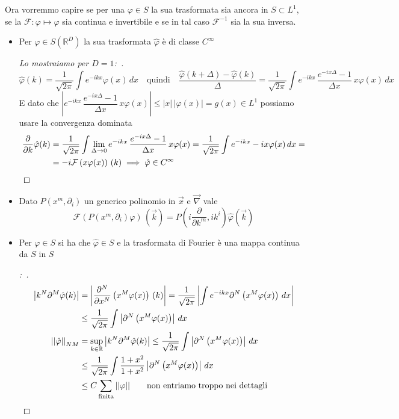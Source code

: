 \documentclass[11pt,a4paper,twoside]{book}
\newenvironment{dimo}[1][\proofname]{
	\begin{tcolorbox}[
	breakable, 
	enhanced, 
	interior hidden, 
	frame hidden, 
	borderline west = {1pt}{0pt}{gray}, 
	top=0pt, bottom=0pt, left=0pt]
\begin{proof}[#1:~]
}
{
\end{proof}
\end{tcolorbox}
}
\theoremstyle{esss}
\theoremstyle{dotless}
\numberwithin{equation}{section} %
\begin{document}
Ora vorremmo capire se per una $\varphi\in S$ la sua trasformata sia ancora in $S\subset L^1$, se la $\mathcal{F}:\varphi\mapsto\hat{\varphi}$ sia continua e invertibile e se in tal caso $\mathcal{F}^{-1}$ sia la sua inversa.


\begin{itemize}
\item Per $\varphi\in S(\mathbb{R}^D)$ la sua trasformata $\hat{\varphi}$ è di classe $C^\infty$
 \begin{dimo}[Lo mostraiamo  per $D=1$]
 \[
 \hat{\varphi}(k)=\dfrac{1}{\sqrt{2\pi}}\int e^{-ikx}\varphi(x)\,dx \quad \text{quindi}\quad
 \dfrac{ \hat{\varphi}(k+\Delta) -\hat{\varphi}(k)}{\Delta}=\dfrac{1}{\sqrt{2\pi}}\int e^{-ikx} \,  \dfrac{e^{-ix\Delta}-1}{\Delta x} \, x\varphi(x)\,dx
 \]
 E dato che $\left| e^{-ikx}\, \dfrac{e^{-ix\Delta}-1}{\Delta x} \, x\varphi(x)\right|\leq |x|\,|\varphi(x)|=g(x)\in L^1$ possiamo usare la convergenza dominata
 \begin{align*}
 \dfrac{\partial}{\partial k}\hat{\varphi}(k)&=\dfrac{1}{\sqrt{2\pi}}\int \lim_{\Delta\rightarrow0}  e^{-ikx}\, \dfrac{e^{-ix\Delta}-1}{\Delta x} \, x\varphi(x) = \dfrac{1}{\sqrt{2\pi}}\int e^{-ikx}-ix\varphi(x)\,dx=\\
 &=-i\mathcal{F}\left(x\varphi(x)\right)\,(k) \implies \hat{\varphi}\in C^\infty \qedhere
 \end{align*}
 \end{dimo}
\item Dato $P(x^m,\partial_i)$ un generico polinomio in $\vec{x}$ e $\vec{\nabla}$ vale
\begin{equation}
\mathcal{F}\left( P(x^m,\partial_i)\varphi \right) \, (\vec{k}) =
P\left(i\dfrac{\partial}{\partial k^m},ik^i\right)\hat{\varphi}(\vec{k})
\end{equation}
\item Per  $\varphi\in S$ si ha che $\hat{\varphi}\in S$ e la trasformata di Fourier è una mappa continua da $S$ in $S$
\begin{dimo}
\begin{align*}
\left| k^N\partial^M \hat{\varphi}(k) \right| &=\left| \dfrac{\partial^N}{\partial x^N} \left( x^M \varphi(x)\right) \, (k)\right| = \dfrac{1}{\sqrt{2\pi}}\left| \int e^{-ikx} \partial^N\left(x^M\varphi(x)\right)\,dx \right| \\ &\leq \dfrac{1}{\sqrt{2\pi}} \int \left| \partial^N\left(x^M\varphi(x)\right)\right|\,dx\\
\left|\left|\hat{\varphi}\right|\right|_{NM}&=\sup_{k\in\mathbb{R}}\left| k^N\partial^M\hat{\varphi}(k) \right|\leq\dfrac{1}{\sqrt{2\pi}}\int \left| \partial^N\left(x^M\varphi(x)\right)\right|\,dx\\
&\leq \dfrac{1}{\sqrt{2\pi}}\int \dfrac{1+x^2}{1+x^2}\left| \partial^N\left(x^M\varphi(x)\right)\right|\,dx\\&\leq C\sum_{\text{finita}}||\varphi|| \qquad \text{non entriamo troppo nei dettagli}\qedhere
\end{align*}
\end{dimo}
\end{itemize} 
\end{document}
